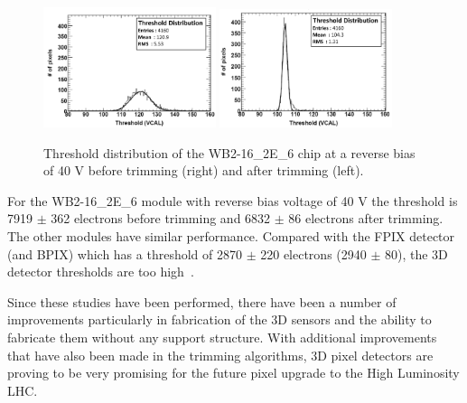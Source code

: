 \begin{figure}[htb!]
\begin{center}
\centerline{
\includegraphics[width=0.45\textwidth]{3D/threshold1.pdf}
\includegraphics[width=0.45\textwidth]{3D/threshold2.pdf}
}
\caption{Threshold distribution of the WB2-16\_2E\_6 chip at a reverse bias of
40 V before trimming (right) and after trimming (left).~\cite{5734879} }
\label{fig:threshold}
\end{center}
\end{figure}

For the WB2-16\_2E\_6 module with reverse bias voltage of 40 V the threshold is 7919 $\pm$ 362 electrons before trimming and 6832 $\pm$ 86 electrons after trimming. The other modules have similar performance. Compared with the FPIX detector (and BPIX) which has a threshold of 2870 $\pm$ 220 electrons (2940 $\pm$ 80), the 3D detector thresholds are too high~\cite{CMSpixel}.

Since these studies have been performed, there have been a number of improvements particularly in fabrication of the 3D sensors and the ability to fabricate them without any support structure.  With additional improvements that have also been made in the trimming algorithms, 3D pixel detectors are proving to be very promising for the future pixel upgrade to the High Luminosity LHC.  
